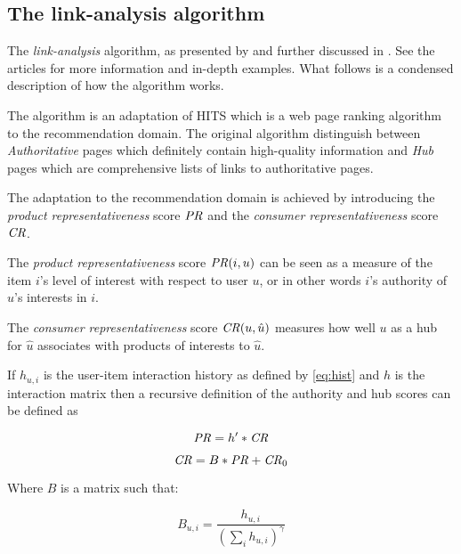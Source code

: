 \subsection{The link-analysis algorithm}\label{sec:background:theory:linkanalysis}


The \textit{link-analysis} algorithm, as presented by \cite{huang2004link} and further discussed in \cite{huang2007comparison}. See the articles for more information and in-depth examples. What follows is a condensed description of how the algorithm works.

The algorithm is an adaptation of HITS \cite{kleinberg1999authoritative} which is a web page ranking algorithm to the recommendation domain. The original algorithm distinguish between \textit{Authoritative} pages which definitely contain high-quality information and \textit{Hub} pages which are comprehensive lists of links to authoritative pages. \citep{huang2007comparison}

The adaptation to the recommendation domain is achieved by introducing the \textit{product representativeness} score $\mathit{PR}$ and the \textit{consumer representativeness} score $\mathit{CR}$.

The \textit{product representativeness} score $\mathit{PR}(i, u)$ can be seen as a measure of the item $i$'s level of interest with respect to user $u$, or in other words $i$'s authority of $u$'s interests in $i$.

The \textit{consumer representativeness} score $\mathit{CR}(u, \hat{u})$ measures how well $u$ as a hub for $\hat{u}$ associates with products of interests to $\hat{u}$.

If $h_{u, i}$ is the user-item interaction history as defined by \ref{eq:hist} and $h$ is the interaction matrix then a recursive definition of the authority and hub scores can be defined as

\begin{equation}
    \mathit{PR} = h' * \mathit{CR}
\end{equation}

\begin{equation}
    \mathit{CR} = B * \mathit{PR} + \mathit{CR}_0
\end{equation}

Where $B$ is a matrix such that:

\begin{equation}
    B_{u, i} = \frac{ h_{u, i} }{ \left(\sum_{i} h_{u, i}\right)^\gamma }
\end{equation}

